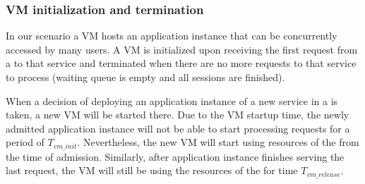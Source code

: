 \subsubsection{VM initialization and termination}
In our scenario a VM hosts an application instance that can be concurrently accessed by many users.
A VM is initialized upon receiving the first request from a \ue{} to that service and terminated when there are no more requests to that service to process (waiting queue is empty and all sessions are finished).

When a decision of deploying an application instance of a new service in a \dc{} is taken, a new VM will be started there.
Due to the VM startup time, the newly admitted application instance will not be able to start processing requests for a period of $T_{vm\_init}$. 
Nevertheless, the new VM will start using resources of the \dc{} from the time of admission.
Similarly, after application instance finishes serving the last request, the VM will still be using the resources of the \dc{} for time $T_{vm\_release}$.


